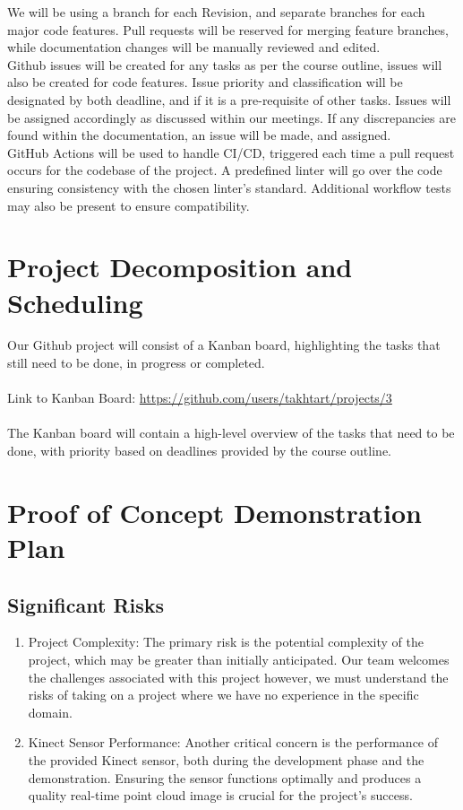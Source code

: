 \documentclass{article}
\begin{document}
We will be using a branch for each Revision, and separate branches for each
major code features. Pull requests will be reserved for merging feature branches,
while documentation changes will be manually reviewed and edited.\\

Github issues will be created for any tasks as per the course outline, issues will also be created for code features.
Issue priority and classification will be designated by both deadline, and if it is a pre-requisite of other tasks.
Issues will be assigned accordingly as discussed within our meetings. 
If any discrepancies are found within the documentation, an issue will be made, and assigned.\\

GitHub Actions will be used to handle CI/CD, triggered each time a pull request occurs for the codebase of the project. 
A predefined linter will go over the code ensuring consistency with the chosen linter's standard. 
Additional workflow tests may also be present to ensure compatibility.


\section{Project Decomposition and Scheduling}

Our Github project will consist of a Kanban board, highlighting the tasks that still need to be done, in progress or completed.\\
\\
\noindent Link to Kanban Board:
\noindent\href{https://github.com/users/takhtart/projects/3}{https://github.com/users/takhtart/projects/3}\\
\\
The Kanban board will contain a high-level overview of the tasks that need to be done, 
with priority based on deadlines provided by the course outline.

\section{Proof of Concept Demonstration Plan}

\subsection*{Significant Risks}
\begin{enumerate}
\item Project Complexity: The primary risk is the potential complexity of the project, which may be greater than initially anticipated. 
Our team welcomes the challenges associated with this project however, we must understand the risks of taking on a project where we have no experience in the specific domain.

\item Kinect Sensor Performance: Another critical concern is the performance of the provided Kinect sensor, both during the development phase and the demonstration. 
Ensuring the sensor functions optimally and produces a quality real-time point cloud image is crucial for the project's success.

\end{enumerate}
\end{document}
